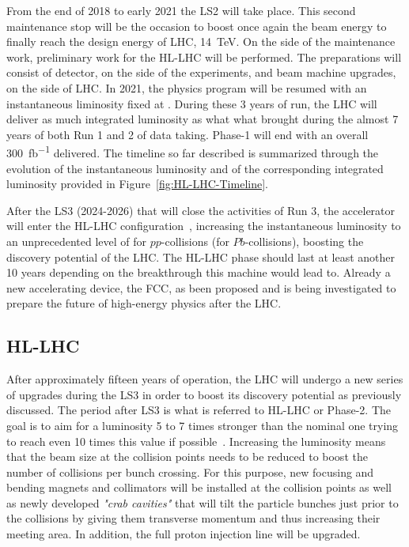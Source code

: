 	From the end of 2018 to early 2021 the \acl{LS2} will take place. This second maintenance stop will be the occasion to boost once again the beam energy to finally reach the design energy of LHC, \SI{14}{TeV}. On the side of the maintenance work, preliminary work for the \acl{HL-LHC} will be performed. The preparations will consist of detector, on the side of the experiments, and beam machine upgrades, on the side of LHC. In 2021, the physics program will be resumed with an instantaneous liminosity fixed at \siflux. During these 3 years of run, the LHC will deliver as much integrated luminosity as what what brought during the almost 7 years of both Run 1 and 2 of data taking. Phase-1 will end with an overall \SI{300}{fb^{-1}} delivered. The timeline so far described is summarized through the evolution of the instantaneous luminosity and of the corresponding integrated luminosity provided in Figure~\ref{fig:HL-LHC-Timeline}.
	
	After the \acl{LS3} (2024-2026) that will close the activities of Run 3, the accelerator will enter the HL-LHC configuration~\cite{HLLHC2017}, increasing the instantaneous luminosity to an unprecedented level of \siflux for $pp$-collisions (\siflux for $Pb$-collisions), boosting the discovery potential of the LHC. The HL-LHC phase should last at least another 10 years depending on the breakthrough this machine would lead to. Already a new accelerating device, the FCC, as been proposed and is being investigated to prepare the future of high-energy physics after the LHC.
	
	\subsection{\acl{HL-LHC}}
	\label{chapt2:ssec:HL-LHC}
		
	After approximately fifteen years of operation, the LHC will undergo a new series of upgrades during the LS3 in order to boost its discovery potential as previously discussed. The period after LS3 is what is referred to HL-LHC or Phase-2. The goal is to aim for a luminosity 5 to 7 times stronger than the nominal one trying to reach even 10 times this value if possible~\cite{HLLHC2017,HLLHCPDR}. Increasing the luminosity means that the beam size at the collision points needs to be reduced to boost the number of collisions per bunch crossing. For this purpose, new focusing and bending magnets and collimators will be installed at the collision points as well as newly developed \textit{"crab cavities"} that will tilt the particle bunches just prior to the collisions by giving them transverse momentum and thus increasing their meeting area. In addition, the full proton injection line will be upgraded.
	
